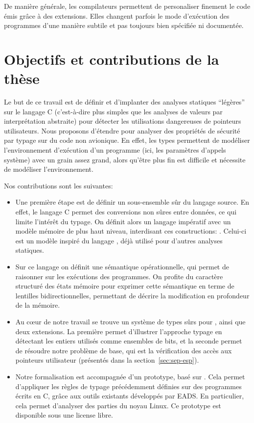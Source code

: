 De manière générale, les compilateurs permettent de personaliser finement le
code émis grâce à des extensions. Elles changent parfois le mode d'exécution des
programmes d'une manière subtile et pas toujours bien spécifiée ni documentée.

\section{Objectifs et contributions de la thèse}

Le but de ce travail est de définir et d'implanter des analyses statiques
\enquote{légères} sur le langage C (c'est-à-dire plus simples que les analyses
de valeurs par interprétation abstraite) pour détecter les utilisations
dangereuses de pointeurs utilisateurs. Nous proposons d'étendre \newspeak pour
analyser des propriétés de sécurité par typage sur du code non avionique. En
effet, les types permettent de modéliser l'environnement d'exécution d'un
programme (ici, les paramètres d'appels système) avec un grain assez grand,
alors qu'être plus fin est difficile et nécessite de modéliser l'environnement.

Nos contributions sont les suivantes:


\begin{itemize}

\item
Une première étape est de définir un sous-ensemble sûr du langage source. En
effet, le langage C permet des conversions non sûres entre données, ce qui
limite l'intérêt du typage. On définit alors un langage impératif avec
un modèle mémoire de plus haut niveau, interdisant ces constructions: \langname.
Celui-ci est un modèle inspiré du langage \newspeak, déjà utilisé pour d'autres
analyses statiques.

\item
Sur ce langage on définit une sémantique opérationnelle, qui permet de raisonner
sur les exécutions des programmes. On profite du caractère structuré des états
mémoire pour exprimer cette sémantique en terme de lentilles bidirectionnelles,
permettant de décrire la modification en profondeur de la mémoire.

\item
Au cœur de notre travail se trouve un système de types sûrs pour \langname,
ainsi que deux extensions. La première permet d'illustrer l'approche typage en
détectant les entiers utilisés comme ensembles de bits, et la seconde permet de
résoudre notre problème de base, qui est la vérification des accès aux pointeurs
utilisateur (présentés dans la section~\ref{sec:sep-esp}).

\item
Notre formalisation est accompagnée d'un prototype, basé sur \newspeak. Cela
permet d'appliquer les règles de typage précédemment définies sur des programmes
écrits en C, grâce aux outils existants développés par EADS. En particulier,
cela permet d'analyser des parties du noyau Linux. Ce prototype est disponible
sous une license libre.

\end{itemize}

